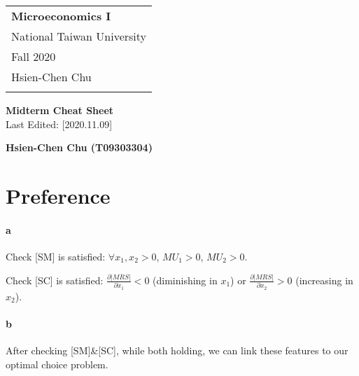 \documentclass{article} %
\begin{document}
\thispagestyle{empty}
\begin{tabular}{p{15.5cm}} %
{\large \bf Microeconomics I} \\
National Taiwan University \\ Fall 2020 \\ Hsien-Chen Chu \\ %
\hline %
\\
\end{tabular} %

\vspace*{0.3cm}
\begin{center}
    {\Large \bf Midterm Cheat Sheet} 
    \\
    Last Edited: [2020.11.09]
	\vspace{2mm}
	
	{\bf Hsien-Chen Chu (T09303304)} %
\end{center}
\vspace{0.4cm}


\section{Preference} %
\paragraph{a} 
    Check [SM] is satisfied: $\forall$$x_1,x_2>0$, $MU_1>0$, $MU_2>0$.
    
    Check [SC] is satisfied: $\frac{\partial|MRS|}{\partial x_1}<0$ (diminishing in $x_1$) or $\frac{\partial|MRS|}{\partial x_2}>0$ (increasing in $x_2$).
    
    
\paragraph{b} 
    After checking [SM]\&[SC], while both holding,  we can link these features to our optimal choice problem.
    \\
   
\end{document}
